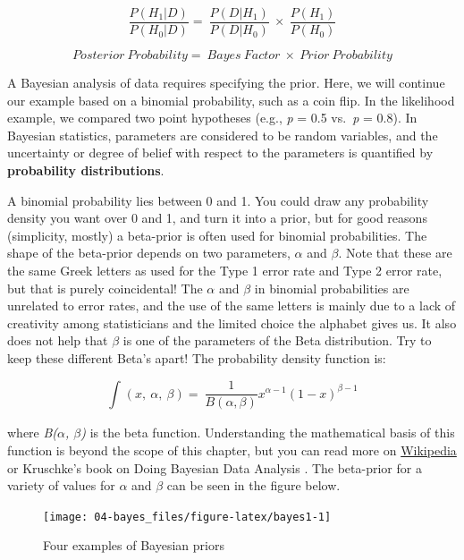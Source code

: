 \documentclass[
  oneside]{book}
\begin{document}
\[
\frac{P(H_1|D)}{P(H_0|D)} = \ \frac{P(D|H_1)}{P(D|H_0)}\  \times \ \frac{P(H_1)}{P(H_0)}
\]

\[
Posterior\ Probability = \ Bayes\ Factor\  \times \ Prior\ Probability
\]

A Bayesian analysis of data requires specifying the prior. Here, we will continue our example based on a binomial probability, such as a coin flip. In the likelihood example, we compared two point hypotheses (e.g., \emph{p} = 0.5 vs.~\emph{p} = 0.8). In Bayesian statistics, parameters are considered to be random variables, and the uncertainty or degree of belief with respect to the parameters is quantified by \textbf{probability distributions}.

A binomial probability lies between 0 and 1. You could draw any probability density you want over 0 and 1, and turn it into a prior, but for good reasons (simplicity, mostly) a beta-prior is often used for binomial probabilities. The shape of the beta-prior depends on two parameters, \(\alpha\) and \(\beta\). Note that these are the same Greek letters as used for the Type 1 error rate and Type 2 error rate, but that is purely coincidental! The \(\alpha\) and \(\beta\) in binomial probabilities are unrelated to error rates, and the use of the same letters is mainly due to a lack of creativity among statisticians and the limited choice the alphabet gives us. It also does not help that \(\beta\) is one of the parameters of the Beta distribution. Try to keep these different Beta's apart! The probability density function is:

\[
\int_{}^{}{\left( x,\ \alpha,\ \beta \right) = \ \frac{1}{B(\alpha,\beta)}}x^{\alpha - 1}{(1 - x)}^{\beta - 1}
\]

where \emph{B(\(\alpha\), \(\beta\))} is the beta function. Understanding the mathematical basis of this function is beyond the scope of this chapter, but you can read more on \href{https://en.wikipedia.org/wiki/Beta_distribution}{Wikipedia} or Kruschke's book on Doing Bayesian Data Analysis \citep{kruschke_doing_2014}. The beta-prior for a variety of values for \(\alpha\) and \(\beta\) can be seen in the figure below.

\begin{figure}

{\centering \texttt{[image: 04-bayes\_files/figure-latex/bayes1-1]} 

}

\caption{Four examples of Bayesian priors}\label{fig:bayes1}
\end{figure}
\end{document}
